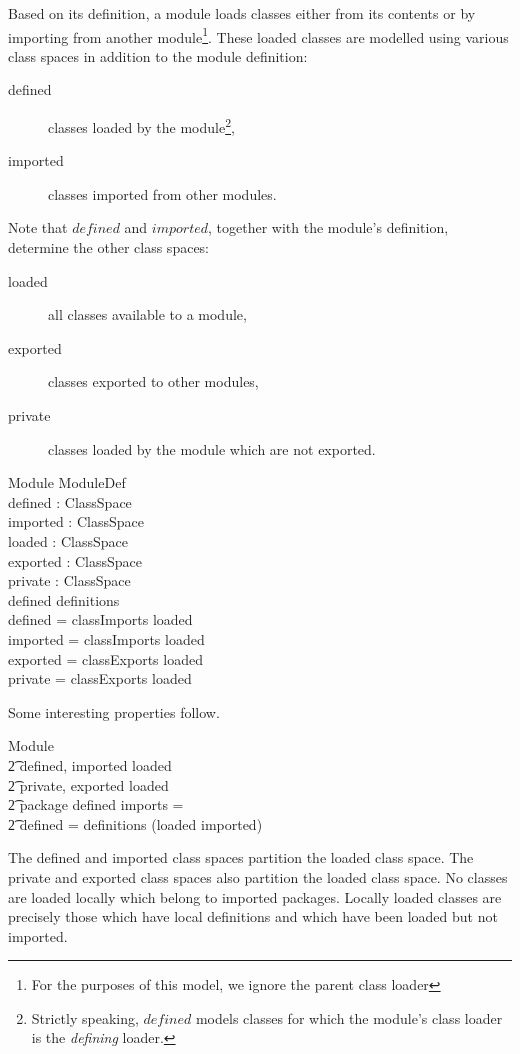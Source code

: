 \documentclass[a4paper,9pt]{article}
\begin{document}
Based on its definition, a module loads classes either from its contents
or by importing from another module\footnote{For the purposes of this
model, we ignore the parent class loader}. 
These loaded classes are modelled using various class spaces
in addition to the module definition:
\begin{description}
\item[defined] classes loaded by the module\footnote{Strictly speaking,
$defined$ models classes for which the module's class loader is the
\textit{defining} loader.},
\item[imported] classes imported from other modules.
\end{description}
Note that $defined$ and $imported$, together with the module's definition,
determine the other class spaces:
\begin{description}
\item[loaded] all classes available to a module,
\item[exported] classes exported to other modules,
\item[private] classes loaded by the module which are not exported.
\end{description}
\begin{schema}{Module}
  ModuleDef \\
  defined : ClassSpace \\
  imported : ClassSpace \\
  loaded : ClassSpace \\
  exported : ClassSpace \\
  private : ClassSpace \\
\where
  defined \subseteq definitions \\
  defined = classImports \ndres loaded \\
  imported = classImports \dres loaded \\
  exported = classExports \dres loaded \\
  private = classExports \ndres loaded \\
\end{schema}

Some interesting properties follow.
\begin{argue}
  Module \vdash \\
\t2 \langle defined, imported \rangle \partition loaded \land \\
\t2 \langle private, exported \rangle \partition loaded \land \\
\t2 package \limg \dom defined \rimg \cap \dom imports = \emptyset \land \\
\t2 defined = definitions \cap (loaded \setminus imported) \\
\end{argue}
The defined and imported class spaces partition the loaded class space.
The private and exported class spaces also partition the loaded class space.
No classes are loaded locally which belong to imported packages.
Locally loaded classes are precisely those which have local definitions
and which have been loaded but not imported.
\end{document}
